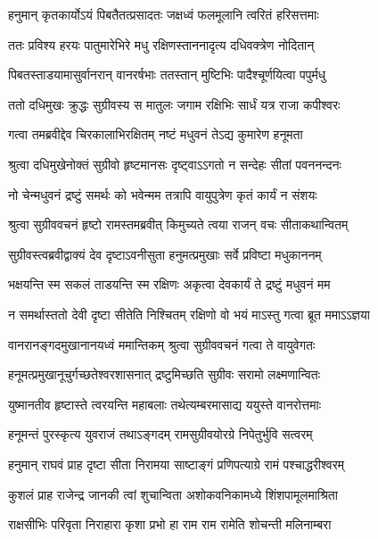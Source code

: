 \twolineshloka
{हनुमान् कृतकार्योऽयं पिबतैतत्प्रसादतः}
{जक्षध्वं फलमूलानि त्वरितं हरिसत्तमाः} %

\twolineshloka
{ततः प्रविश्य हरयः पातुमारेभिरे मधु}
{रक्षिणस्ताननादृत्य दधिवक्त्रेण नोदितान्} %

\twolineshloka
{पिबतस्ताडयामासुर्वानरान् वानरर्षभाः}
{ततस्तान् मुष्टिभिः पादैश्चूर्णयित्वा पपुर्मधु} %

\twolineshloka
{ततो दधिमुखः क्रुद्धः सुग्रीवस्य स मातुलः}
{जगाम रक्षिभिः सार्धं यत्र राजा कपीश्वरः} %

\twolineshloka
{गत्वा तमब्रवीद्देव चिरकालाभिरक्षितम्}
{नष्टं मधुवनं तेऽद्य कुमारेण हनूमता} %

\twolineshloka
{श्रुत्वा दधिमुखेनोक्तं सुग्रीवो हृष्टमानसः}
{दृष्ट्वाऽऽगतो न सन्देहः सीतां पवननन्दनः} %

\twolineshloka
{नो चेन्मधुवनं द्रष्टुं समर्थः को भवेन्मम}
{तत्रापि वायुपुत्रेण कृतं कार्यं न संशयः} %

\twolineshloka
{श्रुत्वा सुग्रीववचनं हृष्टो रामस्तमब्रवीत्}
{किमुच्यते त्वया राजन् वचः सीताकथान्वितम्} %

\twolineshloka
{सुग्रीवस्त्वब्रवीद्वाक्यं देव दृष्टाऽवनीसुता}
{हनुमत्प्रमुखाः सर्वे प्रविष्टा मधुकाननम्} %

\twolineshloka
{भक्षयन्ति स्म सकलं ताडयन्ति स्म रक्षिणः}
{अकृत्वा देवकार्यं ते द्रष्टुं मधुवनं मम} %

\twolineshloka
{न समर्थास्ततो देवी दृष्टा सीतेति निश्चितम्}
{रक्षिणो वो भयं माऽस्तु गत्वा ब्रूत ममाऽऽज्ञया} %

\twolineshloka
{वानरानङ्गदमुखानानयध्वं ममान्तिकम्}
{श्रुत्वा सुग्रीववचनं गत्वा ते वायुवेगतः} %

\twolineshloka
{हनूमत्प्रमुखानूचुर्गच्छतेश्वरशासनात्}
{द्रष्टुमिच्छति सुग्रीवः सरामो लक्ष्मणान्वितः} %

\twolineshloka
{युष्मानतीव हृष्टास्ते त्वरयन्ति महाबलाः}
{तथेत्यम्बरमासाद्य ययुस्ते वानरोत्तमाः} %

\twolineshloka
{हनूमन्तं पुरस्कृत्य युवराजं तथाऽङ्गदम्}
{रामसुग्रीवयोरग्रे निपेतुर्भुवि सत्वरम्} %

\twolineshloka
{हनुमान् राघवं प्राह दृष्टा सीता निरामया}
{साष्टाङ्गं प्रणिपत्याग्रे रामं पश्चाद्धरीश्वरम्} %

\twolineshloka
{कुशलं प्राह राजेन्द्र जानकी त्वां शुचान्विता}
{अशोकवनिकामध्ये शिंशपामूलमाश्रिता} %

\twolineshloka
{राक्षसीभिः परिवृता निराहारा कृशा प्रभो}
{हा राम राम रामेति शोचन्ती मलिनाम्बरा} %

